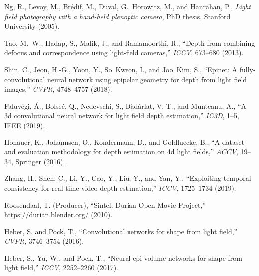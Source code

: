 \documentclass[]{spie}
\begin{document}
\begin{thebibliography}{10}

Ng, R., Levoy, M., Br{\'e}dif, M., Duval, G., Horowitz, M., and Hanrahan, P.,
  {\em Light field photography with a hand-held plenoptic camera}, PhD thesis,
  Stanford University (2005).

Tao, M.~W., Hadap, S., Malik, J., and Ramamoorthi, R., ``Depth from combining
  defocus and correspondence using light-field cameras,''  {\em ICCV}{\nolinebreak\hspace{0.1em}},   673--680 (2013).

Shin, C., Jeon, H.-G., Yoon, Y., So~Kweon, I., and Joo~Kim, S., ``Epinet: A
  fully-convolutional neural network using epipolar geometry for depth from
  light field images,''  {\em CVPR}{\nolinebreak\hspace{0.1em}},   4748--4757
  (2018).

Faluv{\'e}gi, {\'A}., Bolse{\'e}, Q., Nedevschi, S., D{\u{a}}d{\^a}rlat, V.-T.,
  and Munteanu, A., ``A 3d convolutional neural network for light field depth
  estimation,'' {\em IC3D}{\nolinebreak\hspace{0.1em}},   1--5, IEEE (2019).

Honauer, K., Johannsen, O., Kondermann, D., and Goldluecke, B., ``A dataset and
  evaluation methodology for depth estimation on 4d light fields,'' {\em
  ACCV}{\nolinebreak\hspace{0.1em}},   19--34,
  Springer (2016).

Zhang, H., Shen, C., Li, Y., Cao, Y., Liu, Y., and Yan, Y., ``Exploiting
  temporal consistency for real-time video depth estimation,'' {\em
  ICCV}{\nolinebreak\hspace{0.1em}},   1725--1734 (2019).

{Roosendaal, T. (Producer)}, ``Sintel. Durian Open Movie
  Project,'' \url{https://durian.blender.org/} (2010).

Heber, S. and Pock, T., ``Convolutional networks for shape from light field,''
  {\em CVPR}{\nolinebreak\hspace{0.1em}},   3746--3754 (2016).

Heber, S., Yu, W., and Pock, T., ``Neural epi-volume networks for shape from
  light field,'' {\em ICCV}{\nolinebreak\hspace{0.1em}},   2252--2260 (2017).


\end{thebibliography}
\end{document}
